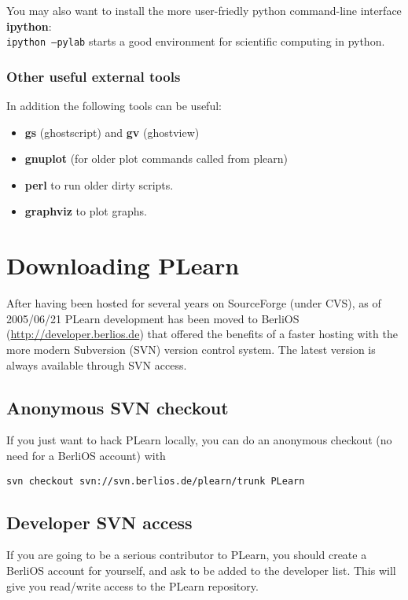 \documentclass[11pt]{book}
\begin{document}
You may also want to install the more user-friedly python command-line interface {\bf
 ipython}: \\
{\tt ipython --pylab} starts a good environment for scientific computing in python.


\subsection{Other useful external tools}

In addition the following tools can be useful:

\begin{itemize}
\item {\bf gs} (ghostscript) and {\bf gv} (ghostview)
\item {\bf gnuplot} (for older plot commands called from plearn)
\item {\bf perl} to run older dirty scripts.
\item {\bf graphviz} to plot graphs.
\end{itemize}

\chapter{Downloading PLearn}

After having been hosted for several years on SourceForge (under CVS), as
of 2005/06/21 PLearn development has been moved to BerliOS
(\url{http://developer.berlios.de}) that offered the benefits of a faster
hosting with the more modern Subversion (SVN) version control system.
The latest version is always available through SVN access.  

\section{Anonymous SVN checkout}

If you just want to hack PLearn locally, you can do an anonymous checkout (no need for a BerliOS account) with
\begin{verbatim}
svn checkout svn://svn.berlios.de/plearn/trunk PLearn
\end{verbatim}

\section{Developer SVN access}
If you are going to be a serious contributor to PLearn, you should create a
BerliOS account for yourself, and ask to be added to the developer list.
This will give you read/write access to the PLearn repository.
\end{document}
